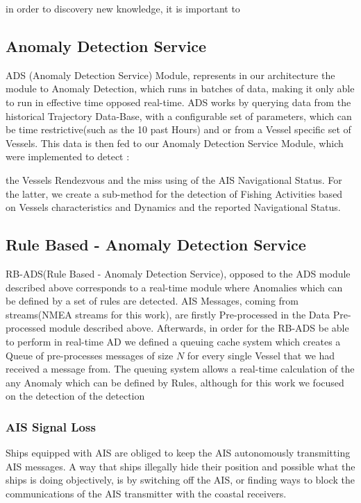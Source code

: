in order to discovery new knowledge, it is important to 


\subsection{Anomaly Detection Service}
ADS (Anomaly Detection Service) Module, represents in our architecture the module to Anomaly Detection, which runs in batches of data, making it only able to run in effective time opposed real-time. ADS works by querying data from the historical Trajectory Data-Base, with a configurable set of parameters, which can be time restrictive(such as the 10 past Hours) and or from a Vessel specific set of Vessels. This data is then fed to our Anomaly Detection Service Module, which were implemented to detect :

the Vessels Rendezvous and the miss using of the AIS Navigational Status.
For the latter, we create a sub-method for the detection of Fishing Activities based on Vessels characteristics and Dynamics and the reported Navigational Status.


\subsection{Rule Based - Anomaly Detection Service}
RB-ADS(Rule Based - Anomaly Detection Service), opposed to the ADS module described above corresponds to a real-time module where Anomalies which can be defined by a set of rules are detected.
AIS Messages, coming from streams(NMEA streams for this work), are firstly Pre-processed in the Data Pre-processed module described above. Afterwards, in order for the RB-ADS be able to perform in real-time AD we defined a queuing cache system which creates a Queue of pre-processes messages of size $N$ for every single Vessel that we had received a message from. 
The queuing system allows a real-time calculation of the any Anomaly which can be defined by Rules, although for this work we focused on the detection of the detection    

\subsubsection{AIS Signal Loss}
Ships equipped with AIS are obliged to keep the AIS autonomously transmitting AIS messages. A way that ships illegally hide their position and possible what the ships is doing objectively, is by switching off the AIS, or finding ways to block the communications of the AIS transmitter with the coastal receivers.

